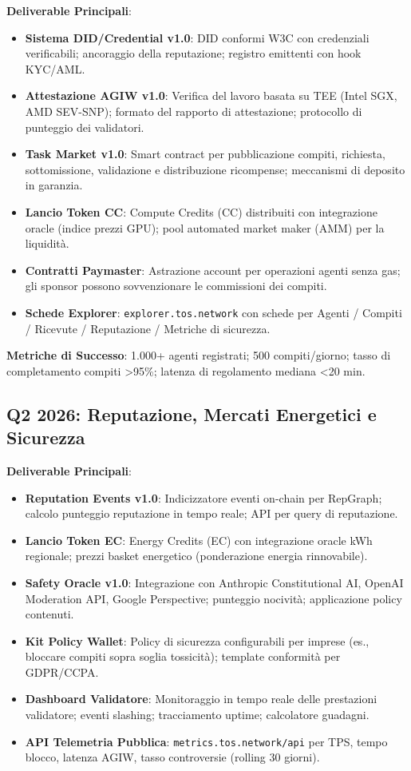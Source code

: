 \documentclass[11pt]{article}
\begin{document}
\begin{itemize}[noitemsep]
\textbf{Deliverable Principali}:
\begin{itemize}[noitemsep]
  \item \textbf{Sistema DID/Credential v1.0}: DID conformi W3C con credenziali verificabili; ancoraggio della reputazione; registro emittenti con hook KYC/AML.
  \item \textbf{Attestazione AGIW v1.0}: Verifica del lavoro basata su TEE (Intel SGX, AMD SEV-SNP); formato del rapporto di attestazione; protocollo di punteggio dei validatori.
  \item \textbf{Task Market v1.0}: Smart contract per pubblicazione compiti, richiesta, sottomissione, validazione e distribuzione ricompense; meccanismi di deposito in garanzia.
  \item \textbf{Lancio Token CC}: Compute Credits (CC) distribuiti con integrazione oracle (indice prezzi GPU); pool automated market maker (AMM) per la liquidità.
  \item \textbf{Contratti Paymaster}: Astrazione account per operazioni agenti senza gas; gli sponsor possono sovvenzionare le commissioni dei compiti.
  \item \textbf{Schede Explorer}: \texttt{explorer.tos.network} con schede per Agenti / Compiti / Ricevute / Reputazione / Metriche di sicurezza.
\end{itemize}

\textbf{Metriche di Successo}: 1.000+ agenti registrati; 500 compiti/giorno; tasso di completamento compiti >95\%; latenza di regolamento mediana <20 min.

\subsection{Q2 2026: Reputazione, Mercati Energetici e Sicurezza}

\textbf{Deliverable Principali}:
\begin{itemize}[noitemsep]
  \item \textbf{Reputation Events v1.0}: Indicizzatore eventi on-chain per RepGraph; calcolo punteggio reputazione in tempo reale; API per query di reputazione.
  \item \textbf{Lancio Token EC}: Energy Credits (EC) con integrazione oracle kWh regionale; prezzi basket energetico (ponderazione energia rinnovabile).
  \item \textbf{Safety Oracle v1.0}: Integrazione con Anthropic Constitutional AI, OpenAI Moderation API, Google Perspective; punteggio nocività; applicazione policy contenuti.
  \item \textbf{Kit Policy Wallet}: Policy di sicurezza configurabili per imprese (es., bloccare compiti sopra soglia tossicità); template conformità per GDPR/CCPA.
  \item \textbf{Dashboard Validatore}: Monitoraggio in tempo reale delle prestazioni validatore; eventi slashing; tracciamento uptime; calcolatore guadagni.
  \item \textbf{API Telemetria Pubblica}: \texttt{metrics.tos.network/api} per TPS, tempo blocco, latenza AGIW, tasso controversie (rolling 30 giorni).
\end{itemize}


\end{itemize}
\end{document}
